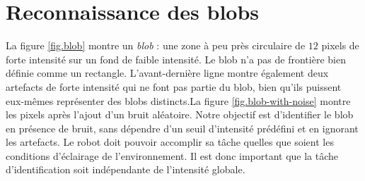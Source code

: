 \section{Reconnaissance des blobs}\label{s.blob}

La figure \ref{fig.blob} montre un \emph{blob} : une zone à peu près circulaire de $12$ pixels de forte intensité sur un fond de faible intensité. Le blob n'a pas de frontière bien définie comme un rectangle. L'avant-dernière ligne montre également deux artefacts de forte intensité qui ne font pas partie du blob, bien qu'ils puissent eux-mêmes représenter des blobs distincts.La figure \ref{fig.blob-with-noise} montre les pixels après l'ajout d'un bruit aléatoire. Notre objectif est d'identifier le blob en présence de bruit, sans dépendre d'un seuil d'intensité prédéfini et en ignorant les artefacts.  Le robot doit pouvoir accomplir sa tâche quelles que soient les conditions d'éclairage de l'environnement. Il est donc important que la tâche d'identification soit indépendante de l'intensité globale.

